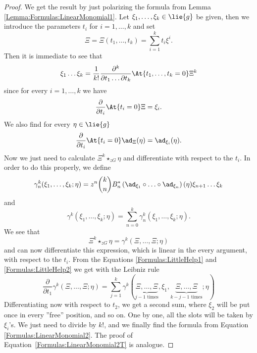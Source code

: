 \begin{proof}
	We get the result by just polarizing the formula from Lemma 
	\ref{Lemma:Formulas:LinearMonomial1}. Let $\xi_1, \ldots, \xi_k \in 
	\lie{g}$ be given, then we introduce the parameters $t_i$ for $i = 
	1, \ldots, k$ and set
	\begin{equation*}
		\Xi
		=		
		\Xi(t_1, \ldots, t_k)
		=
		\sum\limits_{i=1}^k t_i \xi^i.
	\end{equation*}
	Then it is immediate to see that
	\begin{equation*}
		\xi_1 \ldots \xi_k
		=
		\frac{1}{k!}
		\frac{\partial^k}{\partial t_1 \ldots \partial t_k}
		\At{t_1, \ldots, t_k = 0}
		\Xi^k
	\end{equation*}
	since for every $i = 1, \ldots, k$ we have
	\begin{equation}\label{Formulas:LittleHelp1}
		\frac{\partial}{\partial t_i}
		\At{t_i = 0} \Xi
		=
		\xi_i.
	\end{equation}
	We also find for every $\eta \in \lie{g}$
	\begin{equation}\label{Formulas:LittleHelp2}
		\frac{\partial}{\partial t_i}
		\At{t_i = 0} \ad_{\Xi}(\eta)
		=
		\ad_{\xi_i}(\eta).
	\end{equation}
	Now we just need to calculate $\Xi^k \star_{zG} \eta$ and 
	differentiate with respect to the $t_i$. In order to do this 
	properly, we define
	\begin{equation*}
		\gamma_n^k
		(\xi_1, \ldots, \xi_k; \eta)
		=
		z^n \binom{k}{n} B_n^*
		\left( 
			\ad_{\xi_1} 
			\circ \ldots \circ 
			\ad_{\xi_n}
		\right)
		(\eta)
		\xi_{n+1} \ldots \xi_k
	\end{equation*}
	and
	\begin{equation*}
		\gamma^k
		(\xi_1, \ldots, \xi_k; \eta)
		=
		\sum\limits_{n = 0}^k
		\gamma_n^k
		(\xi_1, \ldots, \xi_k; \eta).
	\end{equation*}
	We see that
	\begin{equation*}
		\Xi^k \star_{zG} \eta
		=
		\gamma^k
		(\Xi, \ldots, \Xi; \eta)
	\end{equation*}
	and can now differentiate this expression, which is linear in the 
	every argument, with respect to the $t_i$. From the Equations 
	\eqref{Formulas:LittleHelp1} and \eqref{Formulas:LittleHelp2} we get 
	with the Leibniz rule
	\begin{equation*}
		\frac{\partial}{\partial t_1}
		\gamma^k
		(\Xi, \ldots, \Xi; \eta)
		=
		\sum\limits_{j = 1}^k
		\gamma^k
		(
			\underbrace{\Xi, \ldots, \Xi}_{
				j-1 \text{ times}
			}
			, \xi_1, 
			\underbrace{\Xi, \ldots, \Xi}_{
				k-j-1 \text{ times}
			}
			; \eta
		)
	\end{equation*}
	Differentiating now with respect to $t_2$, we get a second sum, 
	where $\xi_2$ will be put once in every ''free'' position, and so 
	on. One by one, all the slots will be taken by $\xi_i$'s. We just 
	need to divide by $k!$, and we finally find the formula from 
	Equation \eqref{Formulas:LinearMonomial2}. The proof of 
	Equation~\ref{Formulas:LinearMonomial2T} is analogue.
\end{proof}
